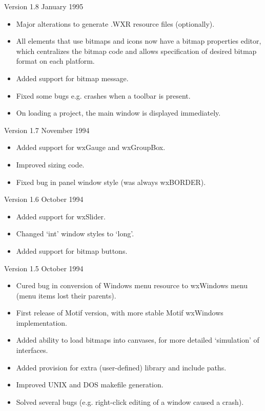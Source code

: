 Version 1.8 January 1995

\begin{itemize}\itemsep=0pt
\item Major alterations to generate .WXR resource files (optionally).
\item All elements that use bitmaps and icons now have a bitmap properties editor,
which centralizes the bitmap code and allows specification of desired bitmap
format on each platform.
\item Added support for bitmap message.
\item Fixed some bugs e.g. crashes when a toolbar is present.
\item On loading a project, the main window is displayed immediately.
\end{itemize}

Version 1.7 November 1994

\begin{itemize}\itemsep=0pt
\item Added support for wxGauge and wxGroupBox.
\item Improved sizing code.
\item Fixed bug in panel window style (was always wxBORDER).
\end{itemize}

Version 1.6 October 1994

\begin{itemize}\itemsep=0pt
\item Added support for wxSlider.
\item Changed `int' window styles to `long'.
\item Added support for bitmap buttons.
\end{itemize}

Version 1.5 October 1994

\begin{itemize}\itemsep=0pt
\item Cured bug in conversion of Windows menu resource to wxWindows menu
(menu items lost their parents).
\item First release of Motif version, with more stable Motif wxWindows implementation.
\item Added ability to load bitmaps into canvases, for more detailed `simulation' of
interfaces.
\item Added provision for extra (user-defined) library and include paths.
\item Improved UNIX and DOS makefile generation.
\item Solved several bugs (e.g. right-click editing of a window caused a crash).
\end{itemize}

